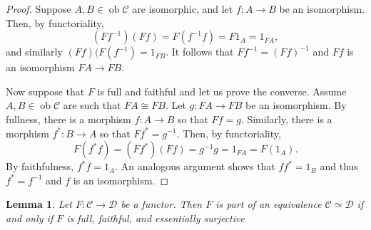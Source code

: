 \documentclass{report}
\DeclareMathOperator{\ob}{ob}
\theoremstyle{definition}
\theoremstyle{plain}
\newtheorem{lem}[thm]{Lemma}
\theoremstyle{definition}
\begin{document}
	\begin{proof}
		Suppose $A,B\in\ob\mathcal{C}$ are isomorphic, and let $f\colon A \to B$ be an isomorphism. Then, by functoriality,
		\[
			(Ff^{-1})(Ff) = F(f^{-1}f) = F1_A = 1_{FA}, 
		\]
		and similarly $(Ff)(F(f^{-1}) = 1_{FB}$. It follows that $Ff^{-1} = (Ff)^{-1}$ and $Ff$ is an isomorphism $FA\to FB$.
		
		Now suppose that $F$ is full and faithful and let us prove the converse. Assume $A,B\in\ob\mathcal{C}$ are such that $FA \cong FB$. Let $g\colon FA \to FB$ be an isomorphism. By fullness, there is a morphism $f\colon A \to B$ so that $Ff = g$. Similarly, there is a morphism $f^{*} \colon B \to A$ so that $Ff^{*} = g^{-1}$. Then, by functoriality,
		\[
			F(f^{*}f) = (Ff^{*})(Ff) = g^{-1}g = 1_{FA} = F(1_A).
		\] 
		By faithfulness, $f^{*}f = 1_A$. An analogous argument shows that $ff^{*} = 1_B$ and thus $f^{*}= f^{-1}$ and $f$ is an isomorphism.
	\end{proof}
	\begin{lem}
		Let $F\colon \mathcal{C}\to \mathcal{D}$ be a functor. Then $F$ is part of an equivalence $\mathcal{C} \simeq \mathcal{D}$ if and only if $F$ is full, faithful, and essentially surjective
	\end{lem}
\end{document}
